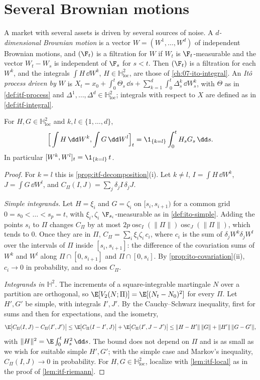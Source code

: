 \section{Several Brownian motions}\label{sec:itf-multi}

A market with several assets is driven by several sources of noise. A \emph{$d$-dimensional
Brownian motion} is a vector $W=(W^1,\dots,W^d)$ of independent Brownian motions, and $(\F_t)$ is a
filtration for $W$ if $W_t$ is $\F_t$-measurable and the vector $W_t-W_s$ is independent of $\F_s$ for
$s<t$. Then $(\F_t)$ is a filtration for each $W^k$, and the integrals $\int H\,\dd W^k$,
$H\in\mathbb H^2_{\mathrm{loc}}$, are those of \cref{ch:07-ito-integral}. An \emph{It\^o process driven
by $W$} is $X_t=x_0+\int_0^t\Theta_s\,\dd s+\sum_{k=1}^d\int_0^t\Delta^k_s\,\dd W^k_s$, with $\Theta$
as in \cref{def:itf-process} and $\Delta^1,\dots,\Delta^d\in\mathbb H^2_{\mathrm{loc}}$; integrals
with respect to $X$ are defined as in \cref{def:itf-integral}.

\begin{lemma}\label{lem:itf-cross}
For $H,G\in\mathbb H^2_{\mathrm{loc}}$ and $k,l\in\{1,\dots,d\}$,
\[
  \Big[\int H\,\dd W^k,\int G\,\dd W^l\Big]_t=\1_{\{k=l\}}\int_0^tH_sG_s\,\dd s .
\]
In particular $[W^k,W^l]_t=\1_{\{k=l\}}\,t$.
\end{lemma}

\begin{proof}
For $k=l$ this is \cref{prop:itf-decomposition}(i).
Let $k\ne l$, $I=\int H\,\dd W^k$, $J=\int G\,\dd W^l$, and $C_\Pi(I,J)=\sum_j\delta_jI\,\delta_jJ$.

\emph{Simple integrands.} Let $H=\xi_i$ and $G=\zeta_i$ on $[s_i,s_{i+1})$ for a common grid
$0=s_0<\dots<s_p=t$, with $\xi_i,\zeta_i$ $\F_{s_i}$-measurable as in \cref{def:ito-simple}. Adding the points $s_i$
to $\Pi$ changes $C_\Pi$ by at most $2p\operatorname{osc}_I(\|\Pi\|)\operatorname{osc}_J(\|\Pi\|)$, which
tends to $0$. Once they are in $\Pi$, $C_\Pi=\sum_i\xi_i\zeta_i\,c_i$, where $c_i$ is the sum of
$\delta_jW^k\delta_jW^l$ over the intervals of $\Pi$ inside $[s_i,s_{i+1}]$: the difference of the
covariation sums of $W^k$ and $W^l$ along $\Pi\cap[0,s_{i+1}]$ and $\Pi\cap[0,s_i]$. By
\cref{prop:ito-covariation}(ii), $c_i\to0$ in probability, and so does $C_\Pi$.

\emph{Integrands in $\mathbb H^2$.} The increments of a square-integrable martingale $N$ over a
partition are orthogonal, so $\E[V_2(N;\Pi)]=\E[(N_t-N_0)^2]$ for every $\Pi$. Let $H',G'$ be simple,
with integrals $I',J'$. By the Cauchy--Schwarz inequality, first for sums and then for expectations,
and the isometry,
\[
  \E\big|C_\Pi(I,J)-C_\Pi(I',J')\big|\le\E\big|C_\Pi(I-I',J)\big|+\E\big|C_\Pi(I',J-J')\big|
  \le\|H-H'\|\,\|G\|+\|H'\|\,\|G-G'\|,
\]
with $\|H\|^2=\E\int_0^tH_s^2\,\dd s$. The bound does not depend on $\Pi$ and is as small as we wish
for suitable simple $H',G'$; with the simple case and Markov's inequality, $C_\Pi(I,J)\to0$ in
probability. For $H,G\in\mathbb H^2_{\mathrm{loc}}$, localize with \cref{lem:itf-local} as in the
proof of \cref{lem:itf-riemann}.
\end{proof}

